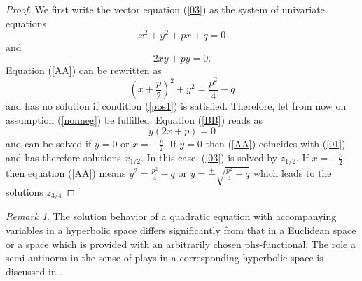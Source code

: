 \documentclass{amsart}
\theoremstyle{definition}
\theoremstyle{remark}
\newtheorem{remark}{Remark}
\numberwithin{equation}{section}
\begin{document}
\begin{proof}We first write the vector equation (\ref{03}) as the system of univariate equations
\begin{equation}\label{AA}
x^2+y^2+px+q=0
\end{equation}
and
\begin{equation}\label{BB}
2xy+py=0.
\end{equation}
Equation (\ref{AA}) can be rewritten as
\[
(x+\frac{p}{2})^2+y^2=\frac{p^2}{4}-q
\]
and has no solution if condition (\ref{pos1}) is satisfied. Therefore, let from now on assumption (\ref{nonneg}) be fulfilled. Equation (\ref{BB}) reads as
\[
y(2x+p)=0
\]
and can be solved if $y=0$ or $x=-\frac{p}{2}.$ \newline If $y=0$ then (\ref{AA})
coincides with (\ref{01}) and has therefore solutions $x_{1/2}$. In this case, (\ref{03}) is solved by $z_{1/2}$.
\newline
If $x=-\frac{p}{2}$ then equation (\ref{AA}) means $y^2=\frac{p^2}{4}-q$ or $y=\overset{+}-\sqrt{\frac{p^2}{4}-q}$ which leads to the  solutions $z_{3/4}$
\end{proof}

\begin{remark}
The solution behavior of a quadratic equation with accompanying variables in a hyperbolic space differs significantly from that in a Euclidean space or a space which is provided with an arbitrarily chosen phs-functional. The role a semi-antinorm in the sense of \cite{MoRi} plays in a corresponding hyperbolic space is discussed in \cite{Richter2022b}.
\end{remark}
\end{document}
